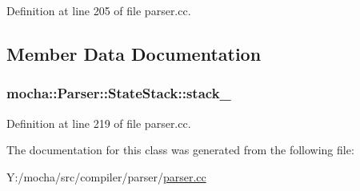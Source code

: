 Definition at line 205 of file parser.cc.



\subsection{Member Data Documentation}
\hypertarget{classmocha_1_1_parser_1_1_state_stack_a9761446601dc3ec85846d28cf346a5f4}{
\subsubsection[{stack\_\-}]{ {\bf mocha::Parser::StateStack::stack\_\-}}}
\label{classmocha_1_1_parser_1_1_state_stack_a9761446601dc3ec85846d28cf346a5f4}


Definition at line 219 of file parser.cc.



The documentation for this class was generated from the following file:\begin{DoxyCompactItemize}
\item 
Y:/mocha/src/compiler/parser/\hyperlink{parser_8cc}{parser.cc}\end{DoxyCompactItemize}
